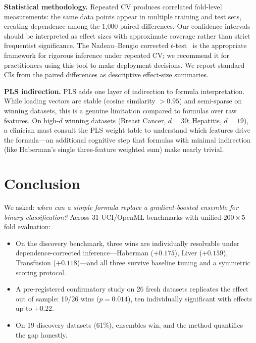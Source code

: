 \documentclass[journal]{IEEEtran}
\begin{document}
\textbf{Statistical methodology.}
Repeated CV produces correlated fold-level measurements: the same
data points appear in multiple training and test sets, creating
dependence among the 1{,}000 paired differences.  Our confidence
intervals should be interpreted as effect sizes with approximate
coverage rather than strict frequentist significance.  The
Nadeau--Bengio corrected $t$-test~\cite{nadeau2003inference} is the
appropriate framework for rigorous inference under repeated CV; we
recommend it for practitioners using this tool to make deployment
decisions.  We report standard CIs from the paired differences
as descriptive effect-size summaries.

\textbf{PLS indirection.}
PLS adds one layer of indirection to formula interpretation.  While
loading vectors are stable (cosine similarity $> 0.95$) and
semi-sparse on winning datasets, this is a genuine limitation
compared to formulas over raw features.  On high-$d$ winning
datasets (Breast Cancer, $d = 30$; Hepatitis, $d = 19$), a
clinician must consult the PLS weight table to understand which
features drive the formula---an additional cognitive step that
formulas with minimal indirection (like Haberman's single
three-feature weighted sum) make nearly trivial.

\section{Conclusion}

We asked: \emph{when can a simple formula replace a gradient-boosted
ensemble for binary classification?}  Across 31 UCI/OpenML
benchmarks with unified $200 \times 5$-fold evaluation:

\begin{itemize}
\item On the discovery benchmark, three wins are individually
resolvable under dependence-corrected inference---Haberman
($+0.175$), Liver ($+0.159$), Transfusion ($+0.118$)---and all
three survive baseline tuning and a symmetric scoring protocol.
\item A pre-registered confirmatory study on 26 fresh datasets
replicates the effect out of sample: 19/26 wins ($p = 0.014$),
ten individually significant with effects up to $+0.22$.
\item On 19 discovery datasets (61\%), ensembles win, and the
method quantifies the gap honestly.
\end{itemize}
\end{document}
